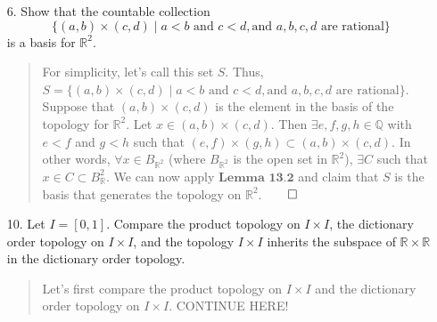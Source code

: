 \documentclass[12pt, a4paper]{article}
\newcommand{\rats}{\mathbb{Q}} %
\newcommand{\reals}{\mathbb{R}} %
\begin{document}
\begin{itemize}
\item[6.]
Show that the countable collection
$$\{(a, b) \times (c, d) \mid a < b \mbox{ and } c < d, \mbox{and } a,b,c,d \mbox{ are rational}\}$$
is a basis for $\reals^2$.
\begin{quote}
For simplicity, let's call this set $S$. Thus, $S = \{(a, b) \times (c, d) \mid a < b \mbox{ and } c < d, \mbox{and } a,b,c,d \mbox{ are rational}\}$.
\newline
\newline
Suppose that $(a, b) \times (c, d)$ is the element in the basis of the topology for $\reals^2$. Let $x \in (a, b) \times (c, d)$.
Then $\exists e, f, g, h \in \rats$ with $e < f$ and $g < h$ such that $(e, f) \times (g, h) \subset (a, b) \times (c, d)$.
In other words, $\forall x \in B_{\reals^2}$ (where $B_{\reals^2}$ is the open set in $\reals^2$), $\exists C$ such that
$x \in C \subset B_\reals^2$. We can now apply $\textbf{Lemma 13.2}$ and claim that $S$ is the basis that generates the topology on $\reals^2$.$\qed$
\end{quote}

\item[]
\item[]

\item[10.]
Let $I = [0, 1]$. Compare the product topology on $I \times I$, the dictionary order
topology on $I \times I$, and the topology $I \times I$ inherits the subspace of $\reals \times \reals$
in the dictionary order topology.
\begin{quote}
Let's first compare the product topology on $I \times I$ and the dictionary order topology on $I \times I$.
CONTINUE HERE!
\end{quote}

\end{itemize}
\end{document}
